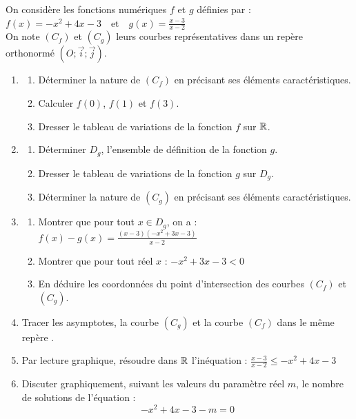 \documentclass[10pt, a4paper]{article}
\begin{document}
\begin{Exercice}[][45 min]
On considère les fonctions numériques $f$ et $g$ définies par : \quad
$f(x) = -x^2 + 4x - 3  \quad \text{et} \quad  g(x) = \frac{x-3}{x-2}$
\vspace{0.2cm} \\
On note $(C_f)$ et $(C_g)$ leurs courbes représentatives dans un repère orthonormé $(O;\vec{i};\vec{j})$.

\begin{enumerate}[leftmargin=*,itemsep=0.5pt]
\item
\begin{enumerate}[leftmargin=*,itemsep=0.5pt]
    \item Déterminer la nature de $(C_f)$ en précisant ses éléments caractéristiques.
    \item Calculer $f(0)$, $f(1)$ et $f(3)$.
    \item Dresser le tableau de variations de la fonction $f$ sur $\mathbb{R}$.
\end{enumerate}
\item
\begin{enumerate}[leftmargin=*,itemsep=0.5pt]
    \item Déterminer $D_g$, l'ensemble de définition de la fonction $g$.
    \item Dresser le tableau de variations de la fonction $g$ sur $D_g$.
    \item Déterminer la nature de $(C_g)$ en précisant ses éléments caractéristiques.
\end{enumerate}
\item
\begin{enumerate}[leftmargin=*,itemsep=0.5pt]
    \item Montrer que pour tout $x \in D_g$, on a :
    $f(x) - g(x) = \frac{(x-3)(-x^2+3x-3)}{x-2}$
    \item Montrer que pour tout réel $x$ : $-x^2+3x-3 < 0 $
    \item En déduire les coordonnées du point d'intersection des courbes $(C_f)$ et $(C_g)$.
\end{enumerate}
\item Tracer les asymptotes, la courbe $(C_g)$ et la courbe $(C_f)$ dans le même repère \Oij.
\item  Par lecture graphique, résoudre dans $\mathbb{R}$ l'inéquation :
$\frac{x-3}{x-2} \le -x^2 + 4x - 3$
\item  Discuter graphiquement, suivant les valeurs du paramètre réel $m$, le nombre de solutions de l'équation :$$-x^2 + 4x - 3 - m = 0$$
\end{enumerate}
\end{Exercice}
\end{document}
